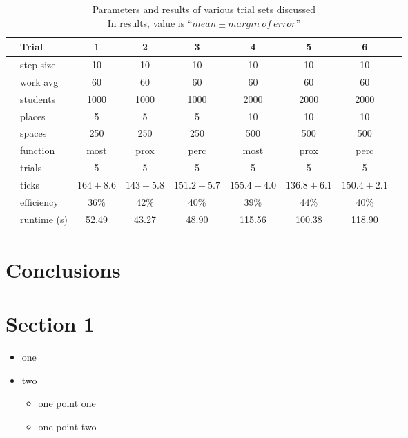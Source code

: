\documentclass[11pt]{article} %
\begin{document}
\begin{table}[]
\footnotesize
\centering
\begin{tabular}{l|l|ccccccc}
 & Trial & 1 & 2 & 3 & 4 & 5 & 6 & \\ \hline
  \parbox[t]{2mm}{} 
 & step size 	& 10  			& 10  			& 10 			& 10 					& 10 				& 10  \\
 & work avg 	& 60 			&  60 			& 60			& 60 					& 60 				& 60 \\
 & students 	& 1000 			& 1000 			& 1000 			& 2000 					& 2000 				& 2000 \\
 & places 		& 5 			& 5 			& 5 			& 10 					& 10 				& 10 \\
 & spaces 		& 250 			& 250 			& 250 			& 500 					& 500 				& 500 \\
 & function 	& most 			& prox 			& perc 			& most 					& prox 				& perc \\
 & trials 		& 5 			& 5 			& 5 			& 5 					& 5 				& 5 \\ \hline
\parbox[t]{2mm}{} 
 & ticks 		& $164\pm 8.6$ 	& $143\pm 5.8$ 	& $151.2\pm 5.7$	& $155.4\pm 4.0$	& $136.8\pm 6.1$	& $150.4\pm 2.1$ \\
 & efficiency 	& 36\%			& 42\%			& 40\%				& 39\%				& 44\%				& 40\% \\
 & runtime (s) 	& 52.49			& 43.27			& 48.90				& 115.56			& 100.38			& 118.90
\end{tabular}
\caption{Parameters and results of various trial sets discussed \\ \footnotesize In results, value is ``$mean \pm margin \: of \: error$''}
\end{table}




\section{Conclusions}





\section{Section 1}

\begin{itemize}
\item one
\item two
  \begin{itemize}
  \item one point one
  \item one point two
  \end{itemize}
\end{itemize}
\end{document}
